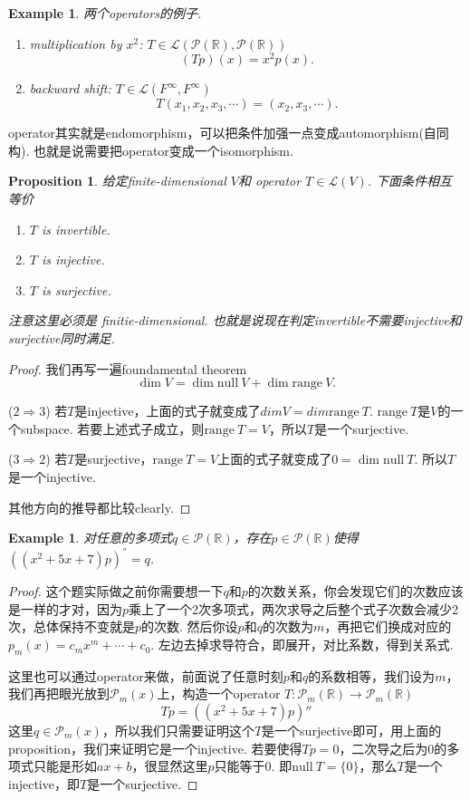 \documentclass{article}
\newtheorem{proposition}[theorem]{Proposition}
\newtheorem{example}[theorem]{Example}
\newcommand*{\xfunc}[4]{{#2}\colon{#3}{#1}{#4}}
\newcommand*{\func}[3]{\xfunc{\to}{#1}{#2}{#3}}
\newcommand\nul[1]{\text{null}\ #1}
\newcommand\range[1]{\text{range}\ #1}
\begin{document}
\begin{example}
两个operators的例子.
\begin{enumerate}
	\item multiplication by $x^2$: $T \in \mathcal{L}(\mathcal{P}(\mathbb{R}),\mathcal{P}(\mathbb{R}))$
	$$
		(Tp)(x) = x^2p(x).
	$$
	\item backward shift: $T \in \mathcal{L}(F^{\infty},F^{\infty})$
	$$
		T(x_1,x_2,x_3,\cdots) = (x_2,x_3,\cdots). 
	$$
\end{enumerate}
\end{example}

{\color{blue} operator其实就是endomorphism，可以把条件加强一点变成automorphism(自同构). 也就是说需要把operator变成一个isomorphism}.

\begin{proposition}
\rm 给定finite-dimensional $V$和 operator $T \in \mathcal{L}(V)$. 下面条件相互等价
\begin{enumerate}
	\item $T$ is invertible.
	\item $T$ is injective.
	\item $T$ is surjective.
\end{enumerate}
注意这里必须是{\color{red} finitie-dimensional}. 也就是说现在判定invertible不需要injective和surjective同时满足.
\end{proposition}

\begin{proof}
我们再写一遍foundamental theorem
$$
\dim V  = \dim \nul{V}  + \dim \range{V}.
$$

($2 \Rightarrow 3$) 若$T$是injective，上面的式子就变成了$dim V = dim \range{T}$. $\range{T}$是$V$的一个subspace. 若要上述式子成立，则$\range{T} = V$，所以$T$是一个surjective.

($3 \Rightarrow 2$) 若$T$是surjective，$\range{T} = V$上面的式子就变成了$0 = \dim\nul{T}$. 所以$T$是一个injective. 

其他方向的推导都比较clearly.
\end{proof}

\begin{example}
对任意的多项式$q \in \mathcal{P}(\mathbb{R})$，存在$p \in \mathcal{P}(\mathbb{R})$使得$((x^2+5x+7)p)^{''}=q$.
\end{example}

\begin{proof}
这个题实际做之前你需要想一下$q$和$p$的次数关系，你会发现它们的次数应该是一样的才对，因为$p$乘上了一个2次多项式，两次求导之后整个式子次数会减少2次，总体保持不变就是$p$的次数. 然后你设$p$和$q$的次数为$m$，再把它们换成对应的$p_m(x)=c_mx^m+\cdots+c_0$. 左边去掉求导符合，即展开，对比系数，得到关系式.

这里也可以通过operator来做，前面说了任意时刻$p$和$q$的系数相等，我们设为$m$，我们再把眼光放到$\mathcal{P}_m(x)$上，构造一个operator $\func{T}{\mathcal{P}_m(\mathbb{R})}{\mathcal{P}_m(\mathbb{R})}$
$$
Tp = ((x^2+5x+7)p)''
$$
这里$q \in \mathcal{P}_m(x)$，所以我们只需要证明这个$T$是一个surjective即可，用上面的proposition，我们来证明它是一个injective. 若要使得$Tp = 0$，二次导之后为0的多项式只能是形如$ax+b$，很显然这里$p$只能等于$0$. 即$\nul{T} = \{0\}$，那么$T$是一个injective，即$T$是一个surjective.
\end{proof}
\end{document}
